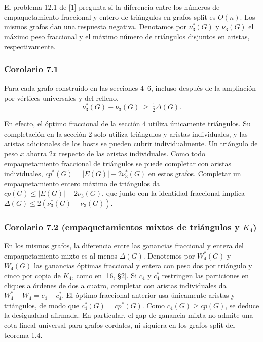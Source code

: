 \documentclass[spanish,11pt,a4paper]{article}
\begin{document}
El problema 12.1 de {[}1{]} pregunta si la diferencia entre los números de empaquetamiento fraccional y entero de triángulos en grafos split es \(O(n)\). Los mismos grafos dan una respuesta negativa. Denotamos por \(\nu_3^*(G)\) y \(\nu_3(G)\) el máximo peso fraccional y el máximo número de triángulos disjuntos en aristas, respectivamente.

\subsubsection{Corolario 7.1}\label{corolario-7.1}

Para cada grafo construido en las secciones 4--6, incluso después de la ampliación por vértices universales y del relleno,
\[\nu_3^*(G)-\nu_3(G)\ \ge\ \tfrac12\Delta(G).\]

En efecto, el óptimo fraccional de la sección 4 utiliza únicamente triángulos. Su completación en la sección 2 solo utiliza triángulos y aristas individuales, y las aristas adicionales de los hosts se pueden cubrir individualmente. Un triángulo de peso \(x\) ahorra \(2x\) respecto de las aristas individuales. Como todo empaquetamiento fraccional de triángulos se puede completar con aristas individuales, \(cp^*(G)=|E(G)|-2\nu_3^*(G)\) en estos grafos. Completar un empaquetamiento entero máximo de triángulos da \(cp(G)\le |E(G)|-2\nu_3(G)\), que junto con la identidad fraccional implica \(\Delta(G)\le2(\nu_3^*(G)-\nu_3(G))\).

\subsubsection{\texorpdfstring{Corolario 7.2 (empaquetamientos mixtos de triángulos y \(K_4\))}{Corolario 7.2 (empaquetamientos mixtos de triángulos y K\_4)}}\label{corolario-7.2-empaquetamientos-mixtos-de-triuxe1ngulos-y-k_4}

En los mismos grafos, la diferencia entre las ganancias fraccional y entera del empaquetamiento mixto es al menos \(\Delta(G)\). Denotemos por \(W_4^*(G)\) y \(W_4(G)\) las ganancias óptimas fraccional y entera con peso dos por triángulo y cinco por copia de \(K_4\), como en {[}16, §2{]}. Si \(c_4\) y \(c_4^*\) restringen las particiones en cliques a órdenes de dos a cuatro, completar con aristas individuales da \(W_4^*-W_4=c_4-c_4^*\). El óptimo fraccional anterior usa únicamente aristas y triángulos, de modo que \(c_4^*(G)=cp^*(G)\). Como \(c_4(G)\ge cp(G)\), se deduce la desigualdad afirmada. En particular, el gap de ganancia mixta no admite una cota lineal universal para grafos cordales, ni siquiera en los grafos split del teorema 1.4.
\end{document}
